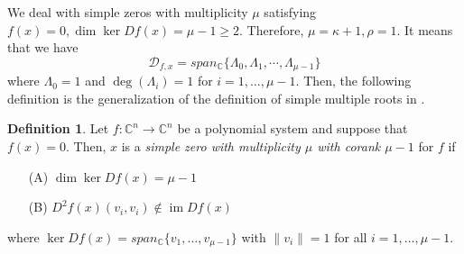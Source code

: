 \documentclass[12pt,oneside,reqno]{amsart}
\theoremstyle{definition}
\newtheorem{defi}[thm]{Definition}
\newcommand{\CC}{\mathbb{C}}
\DeclareMathOperator{\im}{im}
\begin{document}
We deal with simple zeros with multiplicity $\mu$ satisfying $f(x)=0, \dim \ker Df(x)=\mu-1\geq 2$. Therefore, $\mu=\kappa+1, \rho =1$.
It means that we have 
\[\mathcal{D}_{f,x}=span_\mathbb{C}\{\Lambda_0,\Lambda_1,\cdots,\Lambda_{\mu-1}\}\]
where $\Lambda_0=1$ and $\deg(\Lambda_i)=1$ for $i=1,\dots,\mu-1$. Then, the following definition is the generalization of the definition of simple multiple roots in \cite{dedieu2001simple}. 
\begin{defi}\label{def:simpleMultipleZero}
	Let $f:\mathbb{C}^n\rightarrow\mathbb{C}^n$ be a polynomial system and suppose that $f(x)=0$. Then, $x$ is a {\it simple zero with multiplicity $\mu$ with corank $\mu-1$} for $f$ if
	\begin{itemize}
		\item[(A)] $\dim\ker Df(x)=\mu -1$
		\item[(B)] $D^2f(x)(v_i,v_i)\notin \im Df(x)$
	\end{itemize}
	where $\ker Df(x)=span_\CC\{v_1,\dots, v_{\mu-1}\}$ with $\|v_i\|=1$ for all $i=1,\dots, \mu-1$.
	
\end{defi}
\end{document}
